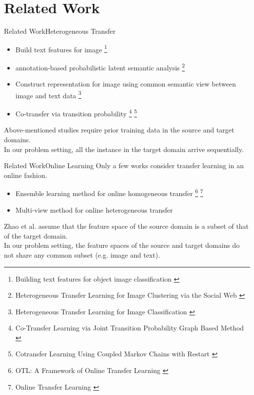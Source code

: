 \documentclass{beamer}
\begin{document}
\section{Related Work}
\begin{frame}{Related Work}{Heterogeneous Transfer}
\begin{itemize}
\item
Build text features for image \footnote{Building text features for object image classification \cite{wang2009building}}
\item
annotation-based probabilistic latent semantic analysis \footnote{Heterogeneous Transfer Learning for Image Clustering via the Social Web \cite{yang2009heterogeneous}}
\item
Construct representation for image using common semantic view between image and text data \footnote{Heterogeneous Transfer Learning for Image Classification \cite{zhu2011heterogeneous}}
\item
Co-transfer via transition probability \footnote{Co-Transfer Learning via Joint Transition Probability Graph Based Method \cite{ng2012co}} \footnote{Cotransfer Learning Using Coupled Markov Chains with Restart \cite{wu2014co}}
\end{itemize}
Above-mentioned studies require prior training data in the source and target domains.
\\
In our problem setting, all the instance in the target domain arrive sequentially.
\end{frame}

\begin{frame}{Related Work}{Online Learning}
Only a few works consider transfer learning in an online fashion.
\begin{itemize}
\item
Ensemble learning method for online homogeneous transfer \footnote{OTL: A Framework of Online Transfer Learning \cite{zhao2010otl}} \footnote{Online Transfer Learning \cite{zhao2014online}}
\item
Multi-view method for online heterogeneous transfer 
\end{itemize}
Zhao et al. assume that the feature space of the source domain is a subset of that of the target domain.
\\
In our problem setting, the feature spaces of the source and target domains do not share any common subset (e.g. image and text).
\end{frame}
\end{document}
